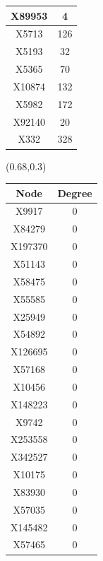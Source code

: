 \documentclass{beamer}
\begin{document}
\begin{frame}[plain]
{\begin{textblock*}{\paperwidth}
\begin{tabular}{| c c |}
X89953  &  4 \\ \hline 
X5713  &  126 \\ \hline 
X5193  &  32 \\ \hline 
X5365  &  70 \\ \hline 
X10874  &  132 \\ \hline 
X5982  &  172 \\ \hline 
X92140  &  20 \\ \hline 
X332  &  328 \\ \hline 
    \end{tabular}
    \hspace{.5em}
  \end{textblock*}
  \begin{textblock*}{\paperwidth}(0.68\textwidth,0.3\textheight)
    \raggedright 
    \tiny
    \begin{tabular}{| c c |}
      \hline
\cellcolor[gray]{0.8} Node & \cellcolor[gray]{0.8} Degree \\ \hline
X9917  &  0 \\ \hline 
X84279  &  0 \\ \hline 
X197370  &  0 \\ \hline 
X51143  &  0 \\ \hline 
X58475  &  0 \\ \hline 
X55585  &  0 \\ \hline 
X25949  &  0 \\ \hline 
X54892  &  0 \\ \hline 
X126695  &  0 \\ \hline 
X57168  &  0 \\ \hline 
X10456  &  0 \\ \hline 
X148223  &  0 \\ \hline 
X9742  &  0 \\ \hline 
X253558  &  0 \\ \hline 
X342527  &  0 \\ \hline 
X10175  &  0 \\ \hline 
X83930  &  0 \\ \hline 
X57035  &  0 \\ \hline 
X145482  &  0 \\ \hline 
X57465  &  0 \\ \hline 
    \end{tabular}
    \hspace{.5em}
  \end{textblock*}
}
\end{frame}
\end{document}
